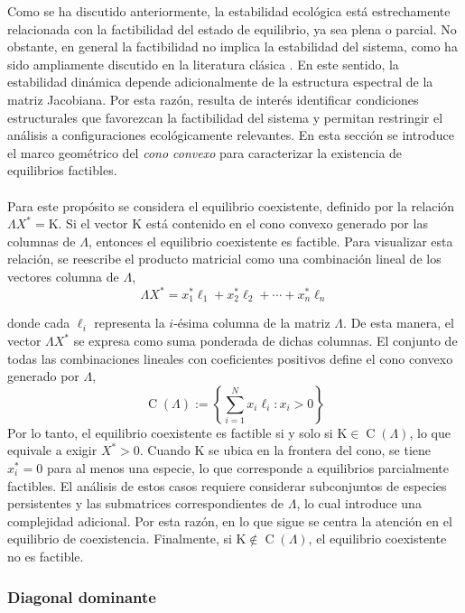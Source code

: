 Como se ha discutido anteriormente, la estabilidad ecológica está estrechamente relacionada con la factibilidad del estado de equilibrio, ya sea plena o parcial. No obstante, en general la factibilidad no implica la estabilidad del sistema, como ha sido ampliamente discutido en la literatura clásica \cite{goh1977feasibility}. En este sentido, la estabilidad dinámica depende adicionalmente de la estructura espectral de la matriz Jacobiana. Por esta razón, resulta de interés identificar condiciones estructurales que favorezcan la factibilidad del sistema y permitan restringir el análisis a configuraciones ecológicamente relevantes. En esta sección se introduce el marco geométrico del \textit{cono convexo} para caracterizar la existencia de equilibrios factibles.\\
\\
Para este propósito se considera el equilibrio coexistente, definido por la relación $\Lambda X^*=\mathrm{K}$. Si el vector $\mathrm{K}$ está contenido en el cono convexo generado por las columnas de $\Lambda$, entonces el equilibrio coexistente es factible. Para visualizar esta relación, se reescribe el producto matricial como una combinación lineal de los vectores columna de $\Lambda$,
$$\Lambda X^*=x_1^*\ell_1+x_2^*\ell_2+\cdots+x_n^*\ell_n$$

donde cada $\ell_i$ representa la $i$-ésima columna de la matriz $\Lambda$. De esta manera, el vector $\Lambda X^*$ se expresa como suma ponderada de dichas columnas. El conjunto de todas las combinaciones lineales con coeficientes positivos define el cono convexo generado por $\Lambda$,
$$\operatorname{C}(\Lambda):=\left \{\sum_{i=1}^N  x_i\ell_i : x_i>0\right \}$$
Por lo tanto, el equilibrio coexistente es factible si y solo si $\mathrm{K}\in \operatorname{C}(\Lambda)$, lo que equivale a exigir $X^* > 0$. Cuando $\mathrm{K}$ se ubica en la frontera del cono, se tiene $x_i^*=0$ para al menos una especie, lo que corresponde a equilibrios parcialmente factibles. El análisis de estos casos requiere considerar subconjuntos de especies persistentes y las submatrices correspondientes de $\Lambda$, lo cual introduce una complejidad adicional. Por esta razón, en lo que sigue se centra la atención en el equilibrio de coexistencia. Finalmente, si $\mathrm{K}\notin \operatorname{C}(\Lambda)$, el equilibrio coexistente no es factible.

\subsubsection*{Diagonal dominante}

